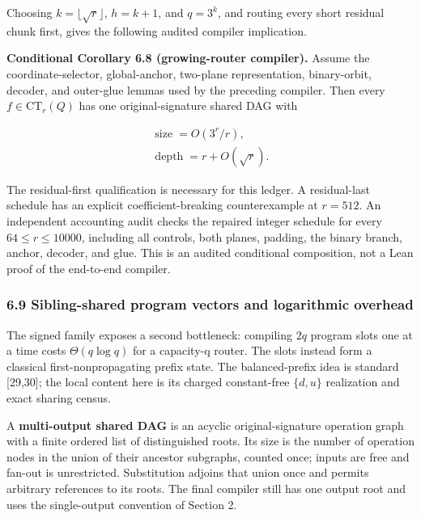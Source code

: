\documentclass[
  11pt,
]{article}
\theoremstyle{definition}
\theoremstyle{remark}
\begin{document}
Choosing \(k=\lfloor \sqrt{r} \rfloor\), \(h=k+1\), and \(q=3^k\), and
routing every short residual chunk first, gives the following audited
compiler implication.

\textbf{Conditional Corollary 6.8 (growing-router compiler).} Assume the
coordinate-selector, global-anchor, two-plane representation,
binary-orbit, decoder, and outer-glue lemmas used by the preceding
compiler. Then every \(f \in \mathrm{CT}_r(Q)\) has one
original-signature shared DAG with

\[
\begin{aligned}
\operatorname{size}  = O(3^r/r), \\
\operatorname{depth} = r+O(\sqrt{r}).
\end{aligned}
\]

The residual-first qualification is necessary for this ledger. A
residual-last schedule has an explicit coefficient-breaking
counterexample at \(r=512\). An independent accounting audit checks the
repaired integer schedule for every \(64\le r\le 10000\), including all
controls, both planes, padding, the binary branch, anchor, decoder, and
glue. This is an audited conditional composition, not a Lean proof of
the end-to-end compiler.

\hypertarget{sibling-shared-program-vectors-and-logarithmic-overhead}{%
\subsubsection{6.9 Sibling-shared program vectors and logarithmic
overhead}\label{sibling-shared-program-vectors-and-logarithmic-overhead}}

The signed family exposes a second bottleneck: compiling \(2q\) program
slots one at a time costs \(\Theta(q \log q)\) for a capacity-q router.
The slots instead form a classical first-nonpropagating prefix state.
The balanced-prefix idea is standard {[}29,30{]}; the local content here
is its charged constant-free \(\{d,u\}\) realization and exact sharing
census.

A \textbf{multi-output shared DAG} is an acyclic original-signature
operation graph with a finite ordered list of distinguished roots. Its
size is the number of operation nodes in the union of their ancestor
subgraphs, counted once; inputs are free and fan-out is unrestricted.
Substitution adjoins that union once and permits arbitrary references to
its roots. The final compiler still has one output root and uses the
single-output convention of Section 2.
\end{document}
